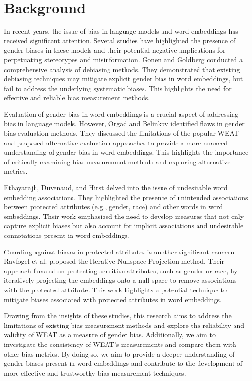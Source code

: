 \documentclass[11pt]{article}
\begin{document}
\section{Background}
In recent years, the issue of bias in language models and word embeddings has received significant attention. Several studies have highlighted the presence of gender biases in these models and their potential negative implications for perpetuating stereotypes and misinformation. Gonen and Goldberg \cite{gonen-goldberg-2019-lipstick} conducted a comprehensive analysis of debiasing methods. They demonstrated that existing debiasing techniques may mitigate explicit gender bias in word embeddings, but fail to address the underlying systematic biases. This highlights the need for effective and reliable bias measurement methods.

Evaluation of gender bias in word embeddings is a crucial aspect of addressing bias in language models. However, Orgad and Belinkov \cite{orgad-belinkov-2022-choose} identified flaws in gender bias evaluation methods. They discussed the limitations of the popular WEAT and proposed alternative evaluation approaches to provide a more nuanced understanding of gender bias in word embeddings. This highlights the importance of critically examining bias measurement methods and exploring alternative metrics.

Ethayarajh, Duvenaud, and Hirst \cite{ethayarajh-etal-2019-understanding} delved into the issue of undesirable word embedding associations. They highlighted the presence of unintended associations between protected attributes (e.g., gender, race) and other words in word embeddings. Their work emphasized the need to develop measures that not only capture explicit biases but also account for implicit associations and undesirable connotations present in word embeddings.

Guarding against biases in protected attributes is another significant concern. Ravfogel et al. \cite{ravfogel-etal-2020-null} proposed the Iterative Nullspace Projection method. Their approach focused on protecting sensitive attributes, such as gender or race, by iteratively projecting the embeddings onto a null space to remove associations with the protected attribute. This work highlights a potential technique to mitigate biases associated with protected attributes in word embeddings.

Drawing from the insights of these studies, this research aims to address the limitations of existing bias measurement methods and explore the reliability and validity of WEAT as a measure of gender bias. Additionally, we aim to investigate the consistency of WEAT's measurements and compare them with other bias metrics. By doing so, we aim to provide a deeper understanding of gender biases present in word embeddings and contribute to the development of more effective and trustworthy bias measurement techniques.
\end{document}
